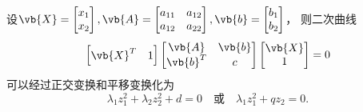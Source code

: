 \begin{theorem}[平面二次曲线的分类定理]
设\(\vb{X} = \begin{bmatrix}
	x_1 \\ x_2
\end{bmatrix},
\vb{A} = \begin{bmatrix}
	a_{11} & a_{12} \\
	a_{12} & a_{22}
\end{bmatrix},
\vb{b} = \begin{bmatrix}
	b_1 \\ b_2
\end{bmatrix}\)，
则二次曲线\[
	\begin{bmatrix}
		\vb{X}^T & 1
	\end{bmatrix}
	\begin{bmatrix}
		\vb{A} & \vb{b} \\
		\vb{b}^T & c
	\end{bmatrix}
	\begin{bmatrix}
		\vb{X} \\ 1
	\end{bmatrix}
	= 0
\]可以经过正交变换和平移变换化为\[
	\lambda_1 z_1^2 + \lambda_2 z_2^2 + d = 0
	\quad\text{或}\quad
	\lambda_1 z_1^2 + q z_2 = 0.
\]
\end{theorem}

